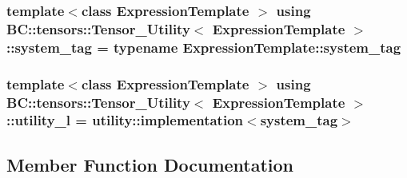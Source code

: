 \subsubsection[{\texorpdfstring{system\+\_\+tag}{system_tag}}]{\setlength{\rightskip}{0pt plus 5cm}template$<$class Expression\+Template $>$ using {\bf B\+C\+::tensors\+::\+Tensor\+\_\+\+Utility}$<$ Expression\+Template $>$\+::{\bf system\+\_\+tag} =  typename Expression\+Template\+::system\+\_\+tag}\hypertarget{structBC_1_1tensors_1_1Tensor__Utility_a6a3f28ec43165a64baf4e328029cf7a0}{}\label{structBC_1_1tensors_1_1Tensor__Utility_a6a3f28ec43165a64baf4e328029cf7a0}
\subsubsection[{\texorpdfstring{utility\+\_\+l}{utility_l}}]{\setlength{\rightskip}{0pt plus 5cm}template$<$class Expression\+Template $>$ using {\bf B\+C\+::tensors\+::\+Tensor\+\_\+\+Utility}$<$ Expression\+Template $>$\+::{\bf utility\+\_\+l} =  utility\+::implementation$<${\bf system\+\_\+tag}$>$}\hypertarget{structBC_1_1tensors_1_1Tensor__Utility_ae309609d855fa2c7253d2c845473a3c0}{}\label{structBC_1_1tensors_1_1Tensor__Utility_ae309609d855fa2c7253d2c845473a3c0}


\subsection{Member Function Documentation}
